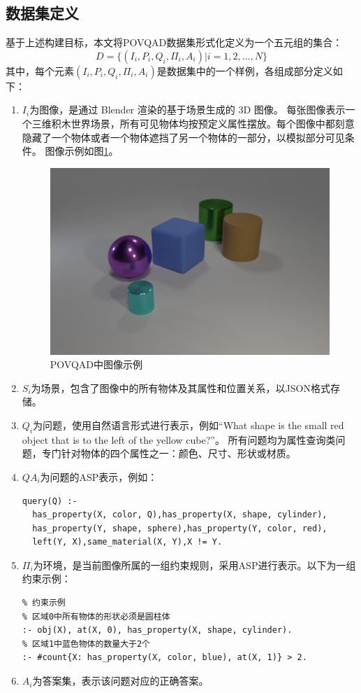 \subsection{数据集定义}
基于上述构建目标，本文将POVQAD数据集形式化定义为一个五元组的集合：
$$D = \{ (I_i,P_i,Q_i,\Pi_i ,A_i) | i=1,2,...,N \}$$
其中，每个元素$(I_i,P_i,Q_i,\Pi_i ,A_i)$是数据集中的一个样例，各组成部分定义如下：
\begin{enumerate}[nosep]
\item \textbf{$I_i$}为图像，是通过 Blender 渲染的基于场景生成的 3D 图像。
每张图像表示一个三维积木世界场景，所有可见物体均按预定义属性摆放。每个图像中都刻意隐藏了一个物体或者一个物体遮挡了另一个物体的一部分，以模拟部分可见条件。
图像示例如图\ref{POVQAD-figure}。
\begin{figure}
\centering
\includegraphics[scale=0.6]{figures/POVQAD中图像示例.png}
\caption{POVQAD中图像示例}
\label{POVQAD-figure}
\end{figure}
\item \textbf{$S_i$}为场景，包含了图像中的所有物体及其属性和位置关系，以JSON格式存储。
\item \textbf{$Q_i$}为问题，使用自然语言形式进行表示，例如“What shape is the small red object that is to the left of the yellow cube?”。
所有问题均为属性查询类问题，专门针对物体的四个属性之一：颜色、尺寸、形状或材质。
\item \textbf{$QA_i$}为问题的ASP表示，例如：
\begin{lstlisting}
query(Q) :-
  has_property(X, color, Q),has_property(X, shape, cylinder),
  has_property(Y, shape, sphere),has_property(Y, color, red),
  left(Y, X),same_material(X, Y),X != Y.
\end{lstlisting}
\item \textbf{$\Pi_i$}为环境，是当前图像所属的一组约束规则，采用ASP进行表示。以下为一组约束示例：
\begin{lstlisting}
% 约束示例
% 区域0中所有物体的形状必须是圆柱体
:- obj(X), at(X, 0), has_property(X, shape, cylinder).
% 区域1中蓝色物体的数量大于2个
:- #count{X: has_property(X, color, blue), at(X, 1)} > 2.
\end{lstlisting}
\item \textbf{$A_i$}为答案集，表示该问题对应的正确答案。
\end{enumerate}
